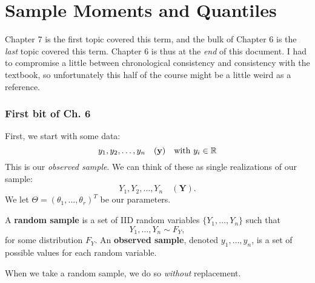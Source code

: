 \setcounter{chapter}{6}
\chapter{Sample Moments and Quantiles} 
Chapter 7 is the first topic covered this term, and the bulk of Chapter 6 is the \textit{last} topic covered this term. Chapter 6 is thus at the \textit{end} of this document. I had to compromise a little between chronological consistency and  consistency with the textbook, so unfortunately this half of the course might be a little weird as a reference. 


\subsection{First bit of Ch. 6}
First, we start with some data:
$$y_1,y_2,\dots,y_n \quad (\mathbf y)\quad \text{with } y_i\in \mathbb R$$
This is our \textit{observed sample}. We can think of these as single realizations of our sample:
$$
Y_1, Y_2, \dots, Y_n \quad (\mathbf Y).
$$
We let $\Theta = (\theta_1,\dots, \theta_r)^T$ be our parameters.

\begin{definition}
		A \textbf{random sample} is a set of IID random variables $\{Y_1,\ldots,Y_n\}$ such that 
		$$Y_1,\dots,Y_n\sim F_Y,$$
		for some distribution $F_Y$. An \textbf{observed sample}, denoted $y_1,\dots,y_n$, is a set of possible values for each random variable.
\end{definition}

\begin{note}		
When we take a random sample, we do so \textit{without} replacement.
\end{note}

